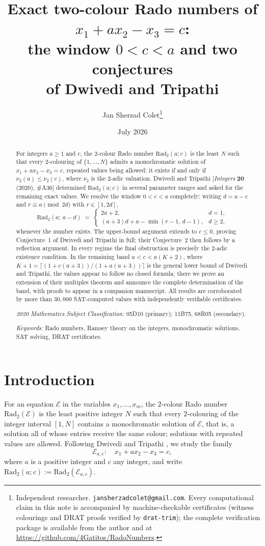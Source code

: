 \documentclass[11pt]{article}
\title{Exact two-colour Rado numbers of $x_1 + a x_2 - x_3 = c$: \\
the window $0 < c < a$ and two conjectures \\ of Dwivedi and Tripathi}
\author{Jan Sherzad Colet\thanks{Independent researcher.
\texttt{jansherzadcolet@gmail.com}. Every computational
claim in this note is accompanied by machine-checkable certificates (witness
colourings and DRAT proofs verified by \texttt{drat-trim}); the complete
verification package is available from the author and at
\url{https://github.com/4Gatitos/RadoNumbers}.}}
\date{July 2026}
\theoremstyle{remark}
\theoremstyle{definition}
\newcommand{\Rad}{\mathrm{Rad}_2}
\newcommand{\vtwo}{\nu_2}
\begin{document}
\maketitle

\begin{abstract}
For integers $a \ge 1$ and $c$, the $2$-colour Rado number $\Rad(a;c)$ is the
least $N$ such that every $2$-colouring of $\{1,\dots,N\}$ admits a
monochromatic solution of $x_1 + a x_2 - x_3 = c$, repeated values being
allowed; it exists if and only if $\vtwo(a) \le \vtwo(c)$, where $\vtwo$ is
the $2$-adic valuation. Dwivedi and Tripathi
[\emph{Integers} \textbf{20} (2020), \#A36] determined $\Rad(a;c)$ in several
parameter ranges and asked for the remaining exact values. We resolve the
window $0 < c < a$ completely: writing $d = a-c$ and $r \equiv a \pmod{2d}$
with $r \in [1,2d]$,
\[
\Rad(a;\,a-d) \;=\;
\begin{cases}
2a+2, & d = 1,\\[2pt]
(a+3)d + a - \min(r-1,\, d-1), & d \ge 2,
\end{cases}
\]
whenever the number exists. The upper-bound argument extends to $c \le 0$,
proving Conjecture~1 of Dwivedi and Tripathi in full; their Conjecture~2
then follows by a reflection argument. In every regime the final obstruction
is precisely the $2$-adic existence condition. In the remaining band
$a < c < a(K+2)$, where
$K+1 = \lceil (1+c(a+3))/(1+a(a+3)) \rceil$ is the general lower bound of
Dwivedi and Tripathi, the values appear to follow no closed formula; there
we prove an extension of their multiples theorem and announce the complete
determination of the band, with proofs to appear in a companion manuscript.
All results are corroborated by more than $30{,}000$ SAT-computed values
with independently verifiable certificates.

\medskip
\noindent\emph{2020 Mathematics Subject Classification:} 05D10 (primary);
11B75, 68R05 (secondary).

\noindent\emph{Keywords:} Rado numbers, Ramsey theory on the integers,
monochromatic solutions, SAT solving, DRAT certificates.
\end{abstract}

\section{Introduction}

For an equation $\mathcal{E}$ in the variables $x_1,\dots,x_m$, the
$2$-colour Rado number $\Rad(\mathcal{E})$ is the least positive integer $N$
such that every $2$-colouring of the integer interval $[1,N]$ contains a
monochromatic solution of $\mathcal{E}$, that is, a solution all of whose
entries receive the same colour; solutions with repeated values are allowed.
Following Dwivedi and Tripathi \cite{DT2020}, we study the family
\[
\mathcal{E}_{a,c}\colon\quad x_1 + a x_2 - x_3 = c ,
\]
where $a$ is a positive integer and $c$ any integer, and write
$\Rad(a;c) := \Rad(\mathcal{E}_{a,c})$.
\end{document}
